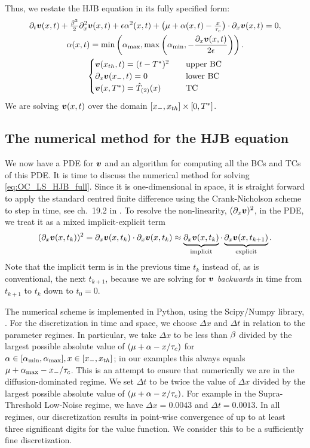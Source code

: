 Thus, we restate the HJB equation in its fully specified form:
\begin{equation}
\begin{gathered}
{\partial}_t { \boldsymbol{v} }(x,t) + \tfrac{\beta^2}{2} {\partial}_x^2{ \boldsymbol{v} }(x,t)+
{\epsilon} \alpha^2(x,t) + \big({\mu } + \alpha(x,t) -\tfrac{x}{\tau_c}\big)\cdot {\partial}_x{ \boldsymbol{v} }(x,t)
= 0,
\\
\alpha (x,t) = \min \left({ \alpha_{\textrm{max}} }, \max\left({ \alpha_{\textrm{min}} }, -\frac{{\partial}_x { \boldsymbol{v} }(x,t)}{2{\epsilon}}\right)
\right).
\\
\begin{cases}
{ \boldsymbol{v} }({ x_{th} },t) = (t-{ T^* })^2  \quad & \textrm{upper BC}
\\
{\partial}_x { \boldsymbol{v} }({ x_{-} }, t)  = 0  \quad &\textrm{lower BC}
\\
{ \boldsymbol{v} }(x,{ T^* })  =
{ \hat{T}_{(2)} }(x)
\,& \textrm{TC}
\end{cases}
\end{gathered}
\label{eq:OC_LS_HJB_full}
\end{equation}
We are solving ${ \boldsymbol{v} }(x,t)$ over the domain $[{ x_{-} }, { x_{th} }] \times [0,{ T^* }]$.

\subsection{The numerical method for the HJB equation}
\label{sec:hjb_numerix}
We now have a PDE for ${ \boldsymbol{v} }$ and an algorithm for computing all the BCs and TCs of
this PDE. It is time to discuss the numerical method for solving
\cref{eq:OC_LS_HJB_full}. Since it is one-dimensional in space, it is straight
forward to apply the standard centred finite difference using the
Crank-Nicholson scheme to step in time, see ch.\ 19.2 in \cite{Press1992}. To
resolve the non-linearity, $({\partial}_x{ \boldsymbol{v} })^2$, in the PDE, we treat it as a mixed
implicit-explicit term $$({\partial}_x { \boldsymbol{v} }(x,t_k))^2 = {\partial}_x { \boldsymbol{v} }(x,t_k) \cdot {\partial}_x
{ \boldsymbol{v} }(x,t_k) \approx \underbrace{{\partial}_x { \boldsymbol{v} }(x,t_k)}_{\textrm{implicit}} \cdot
\underbrace{{\partial}_x{ \boldsymbol{v} }(x,t_{k+1})}_{\textrm{explicit}}.$$ Note that the implicit
term is in the previous time $t_k$ instead of, as is conventional, the next
$t_{k+1}$, because we are solving for ${ \boldsymbol{v} }$ {\sl backwards} in time from
$t_{k+1}$ to $t_k$ down to  $t_0 = 0$.
 
The numerical scheme is implemented in Python, using the Scipy/Numpy library,
\cite{scipy}. For the discretization in time and space, we choose $\Delta x$
and $\Delta t$ in relation to the parameter regimes. In particular, we take $\Delta
x$ to be less than $\beta$ divided by the largest possible absolute value of $({\mu } +
\alpha - x/\tau_c)$ for $\alpha \in [{ \alpha_{\textrm{min}} }, { \alpha_{\textrm{max}} }], x \in [{ x_{-} }, { x_{th} }]$; in our examples
this always equals $\mu + { \alpha_{\textrm{max}} } - { x_{-} }/\tau_c$. This is an attempt to ensure
that numerically we are in the diffusion-dominated regime. We set $\Delta t$ to
be twice the value of $\Delta x$ divided by the largest possible absolute
value of $({\mu } + \alpha - x/\tau_c)$. For example in the Supra-Threshold Low-Noise regime, we
have $\Delta x = 0.0043$ and $\Delta t = 0.0013$. In all regimes, our
discretization results in point-wise convergence of up to at least three
significant digits for the value function. We consider this to be a sufficiently
fine discretization. 


